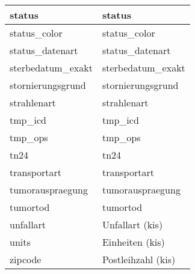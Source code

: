 \begin{longtable}{||p{6cm}|p{7.8cm}||}
  	status & status\\ \hline
  	status\_color & status\_color\\ \hline
  	status\_datenart & status\_datenart\\ \hline
  	sterbedatum\_exakt & sterbedatum\_exakt\\ \hline
  	stornierungsgrund & stornierungsgrund\\ \hline
  	strahlenart & strahlenart\\ \hline
  	tmp\_icd & tmp\_icd\\ \hline
  	tmp\_ops & tmp\_ops\\ \hline
  	tn24 & tn24\\ \hline
  	transportart & transportart\\ \hline
  	tumorauspraegung & tumorauspraegung\\ \hline
  	tumortod & tumortod\\ \hline
  	unfallart & Unfallart (\ac{kis})\\ \hline
  	units & Einheiten (\ac{kis})\\ \hline
  	zipcode & Postleihzahl (\ac{kis})\\ \hline
  
  \end{longtable}